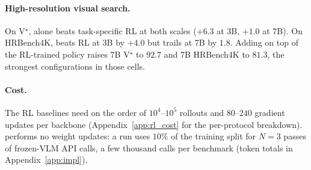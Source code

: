 \paragraph{High-resolution visual search.}
On V$^\star$, \sysname{} alone beats task-specific RL at both scales ($+6.3$ at 3B,
$+1.0$ at 7B). On HRBench4K, \sysname{} beats RL at 3B by $+4.0$ but trails at 7B by
$1.8$. Adding \sysname{} on top of the RL-trained policy raises 7B V$^\star$ to $92.7$
and 7B HRBench4K to $81.3$, the strongest configurations in those cells.

\paragraph{Cost.}
The RL baselines need on the order of $10^4$--$10^5$ rollouts and $80$--$240$ gradient
updates per backbone (Appendix~\ref{app:rl_cost} for the per-protocol breakdown).
\sysname{} performs no weight updates: a run uses $10\%$ of the training split for
$N{=}3$ passes of frozen-VLM API calls, a few thousand calls per benchmark
(token totals in Appendix~\ref{app:impl}).

